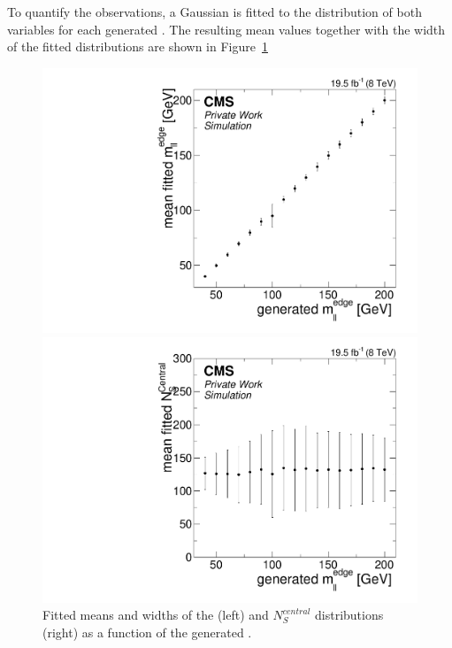 To quantify the observations, a Gaussian is fitted to the distribution of both variables for each generated \mlledge. The resulting mean values together with the width of the fitted distributions are shown in Figure~\ref{fig:toys:scanFits}

\begin{figure}[hbp]
  \centering
  \begin{minipage}[t]{0.49\textwidth}
    \includegraphics[width=\textwidth]{plots/results/fit/toyResults/meanM0vsGenM0_signalInjectedN125.pdf}
  \end{minipage}
  \begin{minipage}[t]{0.49\textwidth}
    \includegraphics[width=\textwidth]{plots/results/fit/toyResults/meanNSvsGenM0_signalInjectedN125.pdf}
  \end{minipage}
  \caption{Fitted means and widths of the \mlledge (left) and $N_S^{central}$ distributions (right) as a function of the generated \mlledge.}
    \label{fig:toys:scanFits}
\end{figure}

